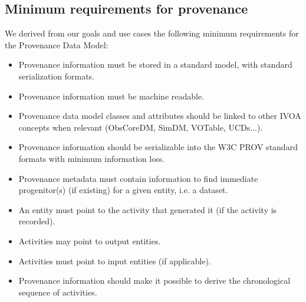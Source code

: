 \subsection{Minimum requirements for provenance}\label{sec:requirements}

We derived from our goals and use cases the following minimum requirements for the Provenance Data Model:


\begin{itemize}


\item Provenance information must be stored in a standard model, with standard serialization formats.

\item Provenance information must be machine readable.

\item Provenance data model classes and attributes should be linked to other IVOA concepts when relevant (ObsCoreDM, SimDM, VOTable, UCDs...).

\item Provenance information should be serializable into the W3C PROV standard formats with minimum information loss.




\item Provenance metadata must contain information to find immediate progenitor(s) (if existing) for a given entity, i.e. a dataset.


\item An entity must point to the activity that generated it (if the activity is recorded).
\item Activities may point to output entities.

\item Activities must point to input entities (if applicable).

\item Provenance information should make it possible to derive the chronological sequence of activities.


\end{itemize}

